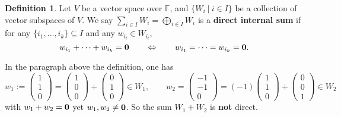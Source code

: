 \documentclass[11pt,openany]{book}
\theoremstyle{plain}
\theoremstyle{definition}
\newtheorem{definition}[definition]{Definition}
\theoremstyle{remark}
\begin{document}
\begin{definition}
    Let $V$ be a vector space over $\mathbb{F}$, and $\{W_i\ |\ i \in I\}$ be a collection of vector subspaces of $V$. We say
    $\sum_{i \in I} W_i = \bigoplus_{i \in I} W_i$ is a {\bf direct internal sum} if for any $\{i_1, \dots, i_k\} \subseteq I$ and any $w_{i_l} \in W_{i_l}$, 
    $$w_{i_1} + \dots + w_{i_k} = {\bf 0} \quad \quad \Leftrightarrow \quad \quad w_{i_1} = \dots = w_{i_k} = {\bf 0}.$$
\end{definition}
In the paragraph above the definition, one has 
$$w_1 := \begin{pmatrix} 1\\ 1\\0 \end{pmatrix} = \begin{pmatrix} 1\\ 0\\0 \end{pmatrix} + \begin{pmatrix} 0\\ 1\\0 \end{pmatrix} \in W_1, \quad \quad w_2 = \begin{pmatrix} -1\\ -1\\0 \end{pmatrix} = (-1)\begin{pmatrix} 1\\ 1\\0 \end{pmatrix} + \begin{pmatrix} 0\\ 0\\1 \end{pmatrix} \in W_2$$ 
with $w_1 + w_2 = {\bf 0}$ yet $w_1, w_2 \neq {\bf 0}$. So the sum $W_1 + W_2$ is {\bf not} direct.
\end{document}
